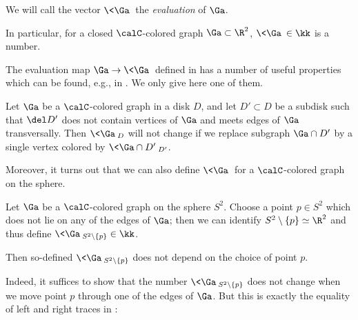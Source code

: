 \begin{theorem}
%
%
We will call the vector $\<\Ga\>$ the {\em evaluation} of $\Ga$.
\end{theorem}

In particular, for a closed $\calC$-colored graph $\Ga\subset \R^2$,
$\<\Ga\>\in \kk$ is a number.

The evaluation map $\Ga\to\<\Ga\>$ defined in  has a
number of useful properties which can be found, e.g., in
. We only give here one of them.

\begin{lemma}\label{l:eval-subdisk}
  Let $\Ga$ be a $\calC$-colored graph in a disk $D$, and let $D'\subset D$ be
  a subdisk such that $\del D'$ does not contain vertices of $\Ga$ and meets
  edges of $\Ga$ transversally. Then $\<\Ga\>_D$ will not change if we replace
  subgraph $\Ga\cap D'$ by a single vertex colored by $\<\Ga\cap D'\>_{D'}$.
\end{lemma}

Moreover, it turns out that we can also define $\<\Ga\>$ for a $\calC$-colored
graph on the sphere.

\begin{lemma}\label{l:colored-spherical}
  Let $\Ga$ be a $\calC$-colored graph on the sphere $S^2$. Choose a point $p\in
  S^2$ which does not lie on any of the edges of $\Ga$; then we can
  identify $S^2\setminus\{p\}\simeq \R^2$ and thus define
  $\<\Ga\>_{S^2\setminus\{p\}}\in \kk$.

  Then so-defined $\<\Ga\>_{S^2\setminus\{p\}}$ does not depend on the choice
  of point
  $p$.
\end{lemma}
Indeed, it suffices to show that the number $\<\Ga\>_{S^2\setminus\{p\}}$ does
not
change when we move point $p$ through one of the edges of $\Ga$. But this is
exactly the equality of left and right traces in :

